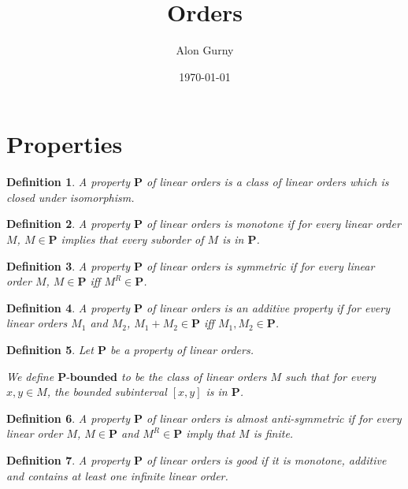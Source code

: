 \documentclass{article}
\author{Alon Gurny}
\title{Orders}
\date{\today}
\newtheorem{definition}{Definition}
\newcommand{\bounded}[1]{{#1} \text{-} \mathbf{bounded}}
\newcommand{\pp}{\mathbf{P}}
\begin{document}
\maketitle

\section{Properties}
\begin{definition}
  A \emph{property} $\pp$ of linear orders is a class of linear orders which
  is closed under isomorphism.
\end{definition}

\begin{definition}
  A property $\pp$ of linear orders is \emph{monotone} if for every linear order $M$,
  $M \in \pp$ implies that every suborder of $M$ is in $\pp$.
\end{definition}

\begin{definition}
  A property $\pp$ of linear orders is \emph{symmetric} if for every linear order $M$,
  $M \in \pp$ iff $M^R \in \pp$.
\end{definition}

\begin{definition}
  A property $\pp$ of linear orders is an \emph{additive property} if for every linear orders $M_1$ and $M_2$,
  $M_1 + M_2 \in \pp$ iff $M_1, M_2 \in \pp$.
\end{definition}

\begin{definition}
  Let $\pp$ be a property of linear orders.

  We define $\bounded{\pp}$ to be the class of linear orders $M$ such that for every $x, y \in M$,
  the bounded subinterval $[x, y]$ is in $\pp$.
\end{definition}

\begin{definition}
  A property $\pp$ of linear orders is \emph{almost anti-symmetric}
  if for every linear order $M$,
  $M \in \pp$ and $M^R \in \pp$ imply that $M$ is finite.
\end{definition}

\begin{definition}
  A property $\pp$ of linear orders is \emph{good} if it is 
  monotone, additive and contains at least one infinite linear order.
\end{definition}
\end{document}
